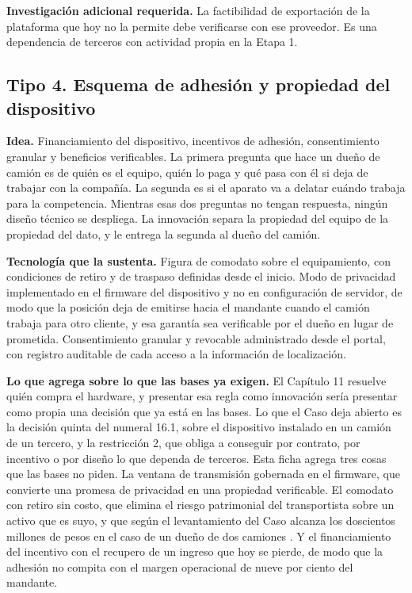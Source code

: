 \textbf{Investigación adicional requerida.} La factibilidad de exportación de la plataforma que hoy
no la permite debe verificarse con ese proveedor. Es una dependencia de terceros con actividad
propia en la Etapa 1.

\subsection{Tipo 4. Esquema de adhesión y propiedad del dispositivo}

\textbf{Idea.} Financiamiento del dispositivo, incentivos de adhesión, consentimiento granular y
beneficios verificables. La primera pregunta que hace un dueño de camión es de quién es el equipo, quién lo
paga y qué pasa con él si deja de trabajar con la compañía. La segunda es si el aparato va a
delatar cuándo trabaja para la competencia. Mientras esas dos preguntas no tengan respuesta, ningún
diseño técnico se despliega. La innovación separa la propiedad del equipo de la propiedad del dato,
y le entrega la segunda al dueño del camión.

\textbf{Tecnología que la sustenta.} Figura de comodato sobre el equipamiento, con condiciones de
retiro y de traspaso definidas desde el inicio. Modo de privacidad implementado en el firmware del
dispositivo y no en configuración de servidor, de modo que la posición deja de emitirse hacia el
mandante cuando el camión trabaja para otro cliente, y esa garantía sea verificable por el dueño en
lugar de prometida. Consentimiento granular y revocable administrado desde el portal, con registro
auditable de cada acceso a la información de localización.

\textbf{Lo que agrega sobre lo que las bases ya exigen.} El Capítulo 11 resuelve quién compra el
hardware, y presentar esa regla como innovación sería presentar como propia una decisión que ya
está en las bases. Lo que el Caso deja abierto es la decisión quinta del numeral 16.1, sobre el
dispositivo instalado en un camión de un tercero, y la restricción 2, que obliga a conseguir por
contrato, por incentivo o por diseño lo que dependa de terceros. Esta ficha agrega tres cosas que
las bases no piden. La ventana de transmisión gobernada en el firmware, que convierte una promesa
de privacidad en una propiedad verificable. El comodato con retiro sin costo, que elimina el riesgo
patrimonial del transportista sobre un activo que es suyo, y que según el levantamiento del Caso
alcanza los doscientos millones de pesos en el caso de un dueño de dos camiones
\parencite{bases_caso10_2026}. Y el
financiamiento del incentivo con el recupero de un ingreso que hoy se pierde, de modo que la
adhesión no compita con el margen operacional de nueve por ciento del mandante.


